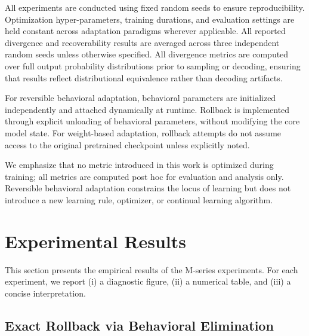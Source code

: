\documentclass[10pt]{article}
\begin{document}
	All experiments are conducted using fixed random seeds to ensure reproducibility. Optimization hyper-parameters, training durations, and evaluation settings are held constant across adaptation paradigms wherever applicable. All reported divergence and recoverability results are averaged across three independent random seeds unless otherwise specified. All divergence metrics are computed over full output probability distributions prior to sampling or decoding, ensuring that results reflect distributional equivalence rather than decoding artifacts.
	
	For reversible behavioral adaptation, behavioral parameters are initialized independently and attached dynamically at runtime. Rollback is implemented through explicit unloading of behavioral parameters, without modifying the core model state. For weight-based adaptation, rollback attempts do not assume access to the original pretrained checkpoint unless explicitly noted.
	
	We emphasize that no metric introduced in this work is optimized during training; all metrics are computed post hoc for evaluation and analysis only. Reversible behavioral adaptation constrains the locus of learning but does not introduce a new learning rule, optimizer, or continual learning algorithm.
	
	\section{Experimental Results}
	\label{sec:results}
	
	This section presents the empirical results of the M-series experiments.
	For each experiment, we report (i) a diagnostic figure, (ii) a numerical table,
	and (iii) a concise interpretation.
	
	
	\subsection{Exact Rollback via Behavioral Elimination}
	\label{sec:elim}
	
\end{document}
